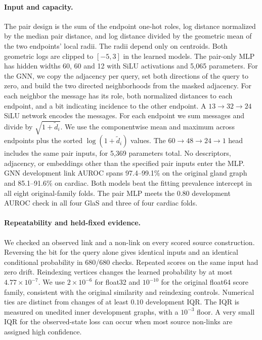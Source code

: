 \documentclass[10pt,twocolumn,letterpaper]{article}
\begin{document}
\paragraph{Input and capacity.}
The pair design is the sum of the endpoint one-hot roles, log distance normalized by the median pair distance, and log distance divided by the geometric mean of the two endpoints' local radii. The radii depend only on centroids. Both geometric logs are clipped to $[-5,3]$ in the learned models. The pair-only MLP has hidden widths 60, 60 and 12 with SiLU activations and 5,065 parameters. For the GNN, we copy the adjacency per query, set both directions of the query to zero, and build the two directed neighborhoods from the masked adjacency. For each neighbor the message has its role, both normalized distances to each endpoint, and a bit indicating incidence to the other endpoint. A $13\to32\to24$ SiLU network encodes the messages. For each endpoint we sum messages and divide by $\sqrt{1+\tilde d_i}$. We use the componentwise mean and maximum across endpoints plus the sorted $\log(1+\tilde d_i)$ values. The $60\to48\to24\to1$ head includes the same pair inputs, for 5,369 parameters total. No descriptors, adjacency, or embeddings other than the specified pair inputs enter the MLP. GNN development link AUROC spans 97.4--99.1\% on the original gland graph and 85.1--91.6\% on cardiac. Both models beat the fitting prevalence intercept in all eight original-family folds. The pair MLP meets the 0.80 development AUROC check in all four GlaS and three of four cardiac folds.

\paragraph{Repeatability and held-fixed evidence.}
We checked an observed link and a non-link on every scored source construction. Reversing the bit for the query alone gives identical inputs and an identical conditional probability in 680/680 checks. Repeated scores on the same input had zero drift. Reindexing vertices changes the learned probability by at most $4.77\times10^{-7}$. We use $2\times10^{-6}$ for float32 and $10^{-10}$ for the original float64 score family, consistent with the original similarity and reindexing controls. Numerical ties are distinct from changes of at least $0.10$ development IQR. The IQR is measured on unedited inner development graphs, with a $10^{-3}$ floor. A very small IQR for the observed-state loss can occur when most source non-links are assigned high confidence.
\end{document}
